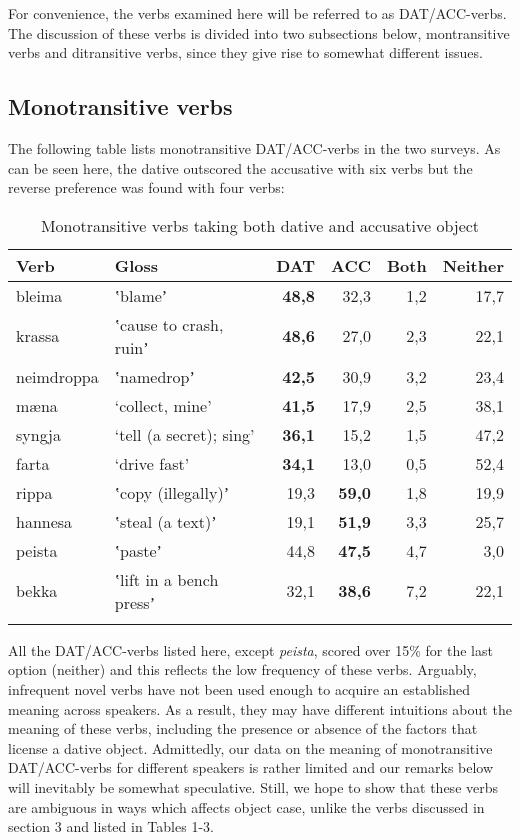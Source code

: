 \documentclass[output=paper,modfonts,nonflat]{langsci/langscibook}
\begin{document}
For convenience, the verbs examined here will be referred to as DAT/ACC-verbs. The discussion of these verbs is divided into two subsections below, montransitive verbs and ditransitive verbs, since they give rise to somewhat different issues.

\subsection{Monotransitive verbs} %

The following table lists monotransitive DAT/ACC-verbs in the two surveys. As can be seen here, the dative outscored the accusative with six verbs but the reverse preference was found with four verbs: 

\begin{table}
{\caption{\label{tab:jonsson:4}Monotransitive verbs taking both dative and accusative object} }
\begin{tabularx}{\textwidth}{XXrrrr}
\lsptoprule
Verb & Gloss & \textbf{DAT} & ACC & Both & Neither\\
\midrule
bleima & ʽblameʼ & \textbf{48,8} & 32,3 & 1,2 & 17,7\\
krassa & ʽcause to crash, ruinʼ & \textbf{48,6} & 27,0 & 2,3 & 22,1\\
neimdroppa & ʽnamedropʼ & \textbf{42,5} & 30,9 & 3,2 & 23,4\\
mæna & ‘collect, mine’ & \textbf{41,5} & 17,9 & 2,5 & 38,1\\
syngja & ‘tell (a secret); sing’ & \textbf{36,1} & 15,2 & 1,5 & 47,2\\
farta & ‘drive fast’ & \textbf{34,1} & 13,0 & 0,5 & 52,4\\
rippa & ʽcopy (illegally)ʼ & 19,3 & \textbf{59,0} & 1,8 & 19,9\\
hannesa & ʽsteal (a text)ʼ & 19,1 & \textbf{51,9} & 3,3 & 25,7\\
peista & ʽpasteʼ & 44,8 & \textbf{47,5} & 4,7 & 3,0\\
bekka & ʽlift in a bench pressʼ & 32,1 & \textbf{38,6} & 7,2 & 22,1\\
\lspbottomrule
\end{tabularx}
\end{table}

All the DAT/ACC-verbs listed here, except \textit{peista}, scored over 15\% for the last option (neither) and this reflects the low frequency of these verbs. Arguably, infrequent novel verbs have not been used enough to acquire an established meaning across speakers. As a result, they may have different intuitions about the meaning of these verbs, including the presence or absence of the factors that license a dative object. Admittedly, our data on the meaning of monotransitive DAT/ACC-verbs for different speakers is rather limited and our remarks below will inevitably be somewhat speculative. Still, we hope to show that these verbs are ambiguous in ways which affects object case, unlike the verbs discussed in section 3 and listed in Tables 1-3. 
\end{document}
